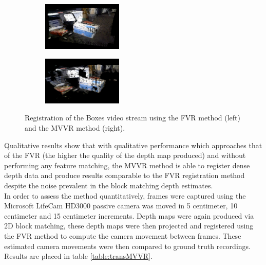 \begin{figure}[!htb]
        \centering
        \begin{subfigure}[b]{1.8in}
                \includegraphics[width=1.5in]{images/results/mvvr/boxesFVR}
                \label{fig:boxFVRRes}
        \end{subfigure}%
        \begin{subfigure}[b]{1.8in}
                \includegraphics[width=1.5in]{images/results/mvvr/boxesMVVR}
                \label{fig:boxMVVRRes}
        \end{subfigure}
        \caption{Registration of the Boxes video stream using the FVR method (left) and the MVVR method (right).}
       \label{fig:boxesMVVRQResults}
\end{figure}

Qualitative results show that with qualitative performance which approaches that of the FVR (the higher the quality of the depth map produced) and without performing any feature matching, the MVVR method is able to register dense depth data and produce results comparable to the FVR registration method despite the noise prevalent in the block matching depth estimates. \\

In order to assess the method quantitatively, frames were captured using the Microsoft LifeCam HD3000 passive camera was moved in 5 centimeter, 10 centimeter and 15 centimeter increments. Depth maps were again produced via 2D block matching, these depth maps were then projected and registered using the FVR method to compute the camera movement between frames. These estimated camera movements were then compared to ground truth recordings. Results are placed in table \ref{table:transMVVR}.

\begin{table}[!htb]
\centering
{}
\\
\caption{Translation Tracking Error for FVR and MVVR}
\label{table:transMVVR}
\end{table}



